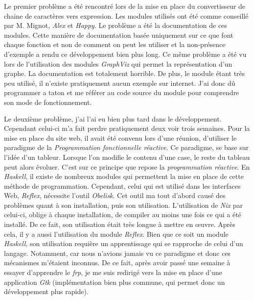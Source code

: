 \vphantom{}

Le premier problème a été rencontré lors de la mise en place du convertisseur de 
chaine de caractères vers expression. Les modules utilisés ont été comme 
conseillé par M. Mignot, \textit{Alex} et \textit{Happy}. Le problème a été la 
documentation de ces modules. Cette manière de documentation basée uniquement 
sur ce que font chaque fonction et non de comment on peut les utiliser et la 
non-présence d'exemple a rendu ce développement bien plus long. Ce même problème 
a été vu lors de l'utilisation des modules \textit{GraphViz} qui permet la 
représentation d'un graphe. La documentation est totalement horrible. De plus, 
le module étant très peu utilisé, il n'existe pratiquement aucun exemple sur 
internet. J'ai donc dû programmer a taton et me référer au code source du module 
pour comprendre son mode de fonctionnement.

\vphantom{}

Le deuxième problème, j'ai l'ai eu bien plus tard dans le développement. 
Cependant celui-ci m’a fait perdre pratiquement deux voir trois semaines. Pour 
la mise en place du site web, il avait été convenu lors d'une réunion, 
d'utiliser le paradigme de la \textit{Programmation fonctionnelle réactive}. Ce 
paradigme, se base sur l'idée d'un tableur. Lorsque l'on modifie le contenu 
d'une case, le reste du tableau peut alors évoluer. C'est sur ce principe que 
repose la \textit{programmation réactive}. En \textit{Haskell}, il existe de 
nombreux modules qui permettent la mise en place de cette méthode de 
programmation. 
Cependant, celui qui est utilisé dans les interfaces Web, \textit{Reflex}, 
nécessite l'outil \textit{Obelisk}. Cet outil ma tout d'abord causé des 
problèmes quant à son installation, puis son utilisation. L'utilisation de 
\textit{Nix} par celui-ci, oblige à chaque installation, de compiler au moins 
une fois ce qui a été installé. De ce fait, son utilisation était très longue à 
mettre en \oe uvre. Après cela, il y a aussi l'utilisation du module 
\textit{Reflex}. Bien que ce soit un module \textit{Haskell}, son utilisation 
requière un apprentissage qui se rapproche de celui d'un langage. Notamment, car 
nous n'avions jamais vu ce paradigme et donc ces mécanismes m'étaient inconnus. 
De ce fait, après avoir passé une semaine à essayer d'apprendre le 
\textit{frp}, je me suis redirigé vers la mise en place d'une application 
\textit{Gtk} (implémentation bien plus commune, qui permet donc un développement 
plus rapide).  

\vphantom{}

